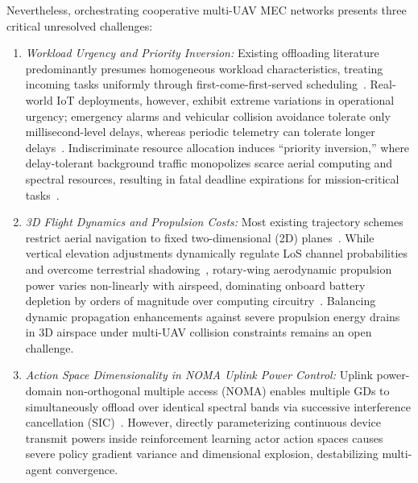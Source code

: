 \documentclass[journal]{IEEEtran}
\begin{document}
Nevertheless, orchestrating cooperative multi-UAV MEC networks presents three critical unresolved challenges:
\begin{enumerate}
    \item \textit{Workload Urgency and Priority Inversion:} Existing offloading literature predominantly presumes homogeneous workload characteristics, treating incoming tasks uniformly through first-come-first-served scheduling~\cite{yang2026drl, tariq2024toward, barman2025joint}. Real-world IoT deployments, however, exhibit extreme variations in operational urgency; emergency alarms and vehicular collision avoidance tolerate only millisecond-level delays, whereas periodic telemetry can tolerate longer delays~\cite{hu2020priority, sun2023priority}. Indiscriminate resource allocation induces ``priority inversion,'' where delay-tolerant background traffic monopolizes scarce aerial computing and spectral resources, resulting in fatal deadline expirations for mission-critical tasks~\cite{sun2023priority, peng2024priority}.
    \item \textit{3D Flight Dynamics and Propulsion Costs:} Most existing trajectory schemes restrict aerial navigation to fixed two-dimensional (2D) planes~\cite{tariq2024toward, sun2023priority}. While vertical elevation adjustments dynamically regulate LoS channel probabilities and overcome terrestrial shadowing~\cite{li2026tnse}, rotary-wing aerodynamic propulsion power varies non-linearly with airspeed, dominating onboard battery depletion by orders of magnitude over computing circuitry~\cite{8937764, li2026tnse}. Balancing dynamic propagation enhancements against severe propulsion energy drains in 3D airspace under multi-UAV collision constraints remains an open challenge.
    \item \textit{Action Space Dimensionality in NOMA Uplink Power Control:} Uplink power-domain non-orthogonal multiple access (NOMA) enables multiple GDs to simultaneously offload over identical spectral bands via successive interference cancellation (SIC)~\cite{11020655, qin2024drl, 10697399}. However, directly parameterizing continuous device transmit powers inside reinforcement learning actor action spaces causes severe policy gradient variance and dimensional explosion, destabilizing multi-agent convergence.
\end{enumerate}
\end{document}
